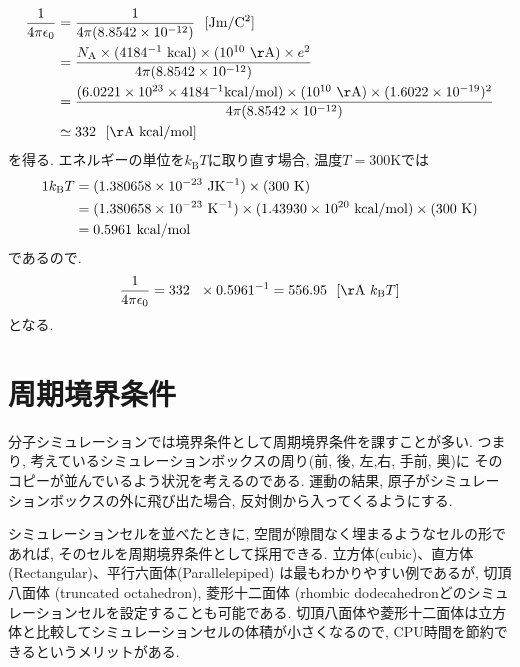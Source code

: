 \begin{align}
  \frac{1}{4 \pi \epsilon_{0}}
  &=
  \frac{1}{4 \pi (8.8542 \times 10^{-12})} ~~ [\mathrm{Jm/C^{2}}]
  \notag \\
  &=
  \frac
  {N_{\mathrm{A}} \times (4184^{-1} ~\mathrm{kcal}) \times (10^{10} ~\mathrm{\AA}) \times e^{2}}
  {4 \pi (8.8542 \times 10^{-12})}
  \notag \\
  &=
  \frac
  {(6.0221 \times 10^{23} \times 4184^{-1} \mathrm{kcal/mol}) \times (10^{10}~\mathrm{\AA}) \times (1.6022 \times 10^{-19})^{2}}
  {4 \pi (8.8542 \times 10^{-12})}
  \notag \\
  &\simeq
  332 ~~ \mathrm{[\AA~kcal/mol]}
  \notag
\end{align}
を得る. エネルギーの単位を$k_{\mathrm{B}}T$に取り直す場合, 温度$T=300$Kでは
\begin{align}
  1 k_{\mathrm{B}}T
  &=
  (1.380658 \times 10^{-23} ~\mathrm{JK^{-1}})
  \times
  (300~\mathrm{K})
  \notag \\
  &=
  (1.380658 \times 10^{-23} ~\mathrm{K^{-1}})
  \times
  (1.43930 \times 10^{20} ~\mathrm{kcal/mol})
  \times
  (300~\mathrm{K})
  \notag \\
  &=
  0.5961~\mathrm{kcal/mol}
  \notag
\end{align}
であるので.
\begin{align}
  \frac{1}{4 \pi \epsilon_{0}}
  =
  332 ~~ \times 0.5961^{-1}
  =
  556.95~~[\mathrm{\AA}~k_{\mathrm{B}}T]
  \notag
\end{align}
となる.

\section{周期境界条件}
分子シミュレーションでは境界条件として周期境界条件を課すことが多い.
つまり, 考えているシミュレーションボックスの周り(前, 後, 左,右, 手前, 奥)に
そのコピーが並んでいるよう状況を考えるのである.
運動の結果, 原子がシミュレーションボックスの外に飛び出た場合,
反対側から入ってくるようにする.

シミュレーションセルを並べたときに, 空間が隙間なく埋まるようなセルの形であれば, そのセルを周期境界条件として採用できる. 立方体(cubic)、直方体 (Rectangular)、平行六面体(Parallelepiped) は最もわかりやすい例であるが, 切頂八面体 (truncated octahedron), 菱形十二面体 (rhombic dodecahedronどのシミュレーションセルを設定することも可能である\cite{2017Allen}. 
切頂八面体や菱形十二面体は立方体と比較してシミュレーションセルの体積が小さくなるので, CPU時間を節約できるというメリットがある\cite{2020GromacsManual}.

